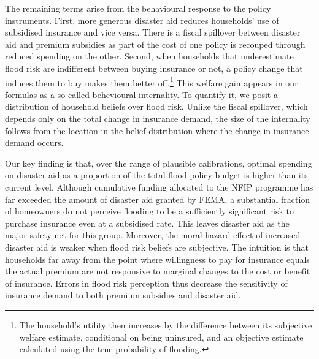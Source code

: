\documentclass[12pt]{article}
\begin{document}
The remaining terms arise from the behavioural response to the policy instruments. First,  more generous disaster aid reduces households' use of subsidised insurance and vice versa. There is a fiscal spillover between disaster aid and premium subsidies as part of the cost of one policy is recouped through reduced spending on the other. Second, when households that underestimate flood risk are indifferent between buying insurance or not, a policy change that induces them to buy makes them better off.\footnote{The household's utility then increases by the difference between its subjective welfare estimate, conditional on being uninsured, and an objective estimate calculated using the true probability of flooding.}  This welfare gain appears in our formulas as a so-called behevioural internality. To quantify it, we posit a distribution of household beliefs over flood risk. Unlike the fiscal spillover, which depends only on the total change in insurance demand, the size of the internality follows from the location in the belief distribution where the change in insurance demand occurs.

Our key finding is that, over the range of plausible calibrations, optimal spending on disaster aid as a proportion of the total flood policy budget is higher than its current level. Although cumulative funding allocated to the NFIP programme has far exceeded the amount of disaster aid granted by FEMA, a substantial fraction of homeowners do not perceive flooding to be a sufficiently significant risk to purchase insurance even at a subsidised rate. This leaves disaster aid as the major safety net for this group. Moreover, the moral hazard effect of increased disaster aid is weaker when flood risk beliefs are subjective. The intuition is that households far away from the point where willingness to pay for insurance equals the actual premium are not responsive to marginal changes to the cost or benefit of insurance. Errors in flood risk perception thus decrease the sensitivity of insurance demand to both premium subsidies and disaster aid.    
\end{document}

